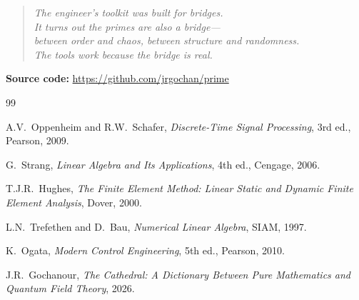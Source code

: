 \documentclass[11pt,a4paper]{article}
\begin{document}
\begin{quote}
\emph{The engineer's toolkit was built for bridges.\\
It turns out the primes are also a bridge---\\
between order and chaos, between structure and randomness.\\
The tools work because the bridge is real.}
\end{quote}

\vspace{0.5cm}
\noindent\textbf{Source code:} \url{https://github.com/jrgochan/prime}

\begin{thebibliography}{99}

A.V.~Oppenheim and R.W.~Schafer, \emph{Discrete-Time Signal
Processing}, 3rd ed., Pearson, 2009.

G.~Strang, \emph{Linear Algebra and Its Applications}, 4th ed.,
Cengage, 2006.

T.J.R.~Hughes, \emph{The Finite Element Method: Linear Static and
Dynamic Finite Element Analysis}, Dover, 2000.

L.N.~Trefethen and D.~Bau, \emph{Numerical Linear Algebra}, SIAM,
1997.

K.~Ogata, \emph{Modern Control Engineering}, 5th ed., Pearson, 2010.

J.R.~Gochanour, \emph{The Cathedral: A Dictionary Between Pure
Mathematics and Quantum Field Theory}, 2026.

\end{thebibliography}
\end{document}
